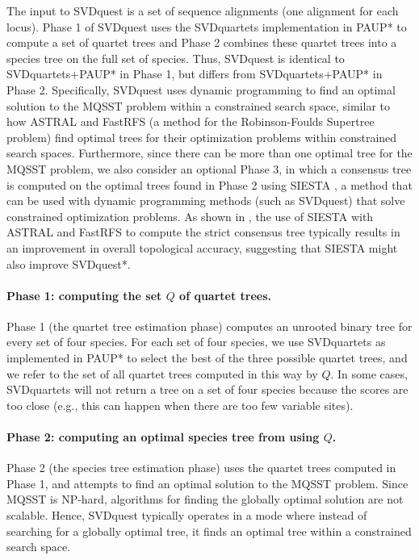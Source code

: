 The input to SVDquest is a set of sequence alignments (one alignment
for each locus).  
Phase 1 of SVDquest uses the SVDquartets implementation in PAUP* to compute a set of quartet trees
and Phase 2 combines these quartet trees into a species tree on the
full set of species.  
Thus, SVDquest is identical to SVDquartets+PAUP* in Phase 1, but differs from SVDquartets+PAUP* in Phase 2.
{
Specifically, SVDquest uses dynamic programming to find an optimal solution to the MQSST problem within a constrained search space, similar to how ASTRAL and FastRFS \cite{fastrfs} (a method for the Robinson-Foulds Supertree problem) find optimal trees for their optimization problems within constrained search spaces.
Furthermore, since there can be more than one optimal tree for the MQSST problem, we}
also consider an optional Phase 3, in which a consensus tree is computed on the optimal trees found in Phase 2 using SIESTA \cite{vachaspati2017enhancing}, a method that
can be used with dynamic programming methods (such as SVDquest) that solve constrained
optimization problems.
 As shown in \cite{vachaspati2017enhancing}, the use of  SIESTA with ASTRAL and FastRFS   to compute the strict consensus tree typically results in an improvement in overall topological accuracy, 
 suggesting that SIESTA might also improve SVDquest*.





\paragraph{Phase 1: computing the set $Q$ of quartet trees. }
Phase 1 (the quartet tree estimation phase) computes 
an unrooted binary tree for every set  of four species. 
For each set of four species, we use SVDquartets as implemented in PAUP* to select the best
of the three possible quartet trees, and we refer to the set of all
quartet trees computed in this way by $Q$.  
In some cases, SVDquartets
will not return a tree on a set of four species because the scores are
too close (e.g., this can happen when there are too few variable
sites).


\paragraph{Phase 2: computing an optimal species tree from using 
$Q$. }
Phase 2 (the species tree estimation phase) uses the quartet trees
computed in Phase 1, and attempts to find an optimal solution to the MQSST problem.  
Since MQSST is NP-hard, algorithms for finding the globally optimal solution are not scalable. 
Hence, SVDquest typically operates in a mode
where instead of searching for a globally optimal tree, it finds an optimal tree within a constrained search space.

